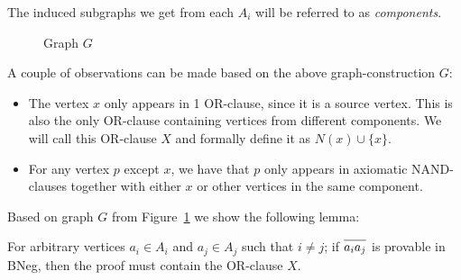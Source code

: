 The induced subgraphs we get from each $A_i$ will be referred to as \textit{components}.\par
\begin{figure}[!h]
  \centering
  \caption{Graph $G$}
  \label{fig:components_link}
\end{figure}
A couple of observations can be made based on the above graph-construction $G$:
\begin{itemize}
  \item The vertex $x$ only appears in 1 OR-clause, since it is a source vertex.
  This is also the only OR-clause containing vertices from different components.
  We will call this OR-clause $X$ and formally define it as $N(x) \cup \{ x\}$.
  \item For any vertex $p$ except $x$, we have that $p$ only appears in axiomatic NAND-clauses together with either $x$ or other vertices in the same component.
\end{itemize}
Based on graph $G$ from Figure~\ref{fig:components_link} we show the following lemma:
\begin{lemma}
  For arbitrary vertices $a_i \in A_i$ and $a_j \in A_j$ such that $i \neq j$; if $\ol{a_ia_j}$ is provable in BNeg, then the proof must contain the OR-clause $X$.
  \label{thm:or_clause_lemma}
\end{lemma}
